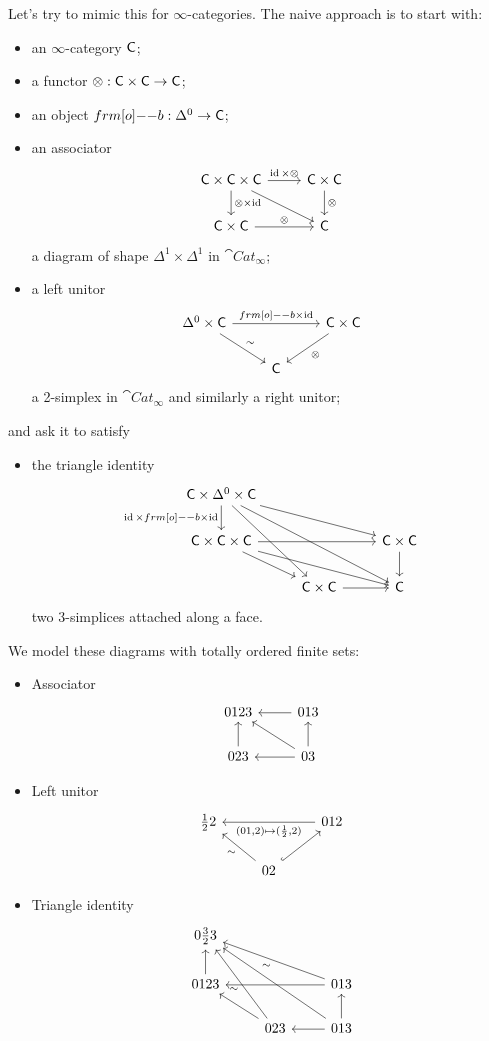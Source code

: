 	Let's try to mimic this for $\infty$-categories. The naive approach is to start with:
	\begin{itemize}
		\item an $\infty$-category $\mathsf{C}$;
		\item a functor $\otimes:\C\times \C\to \C$;
		\item an object $\1b:\Delta^{0}\to \C$;
		\item an associator
			\[
				\begin{tikzcd}
					\C\times \C\times \C \ar[r,"\id\times \otimes"] \ar[d,"\otimes\times \id"] \ar[dr] &
					\C \times \C \ar[d,"\otimes"] \\
					\C\times \C \ar[r,"\otimes"] & \C
				\end{tikzcd}
			\]
			a diagram of shape $\Delta^{1}\times \Delta^{1}$ in $\cat{Cat}_\infty$;
		\item a left unitor
			\[
				\begin{tikzcd}
					\Delta^{0}\times \C \ar[rr,"\1b\times \id"] \ar[dr,"\sim"] & & \C\times \C \ar[dl,"\otimes"] \\
					& \C
				\end{tikzcd}
			\]
			a 2-simplex in $\cat{Cat}_\infty$ and similarly a right unitor;
	\end{itemize}
	and ask it to satisfy
	\begin{itemize}
		\item the triangle identity
			\[
				\begin{tikzcd}
					\C\times \Delta^{0}\times \C \ar[d,"\id\times \1b\times \id"'] \ar[ddr] \ar[ddrr] \ar[drr] \\
					\C\times \C\times \C \ar[dr] \ar[rr] \ar[drr] & & \C\times \C \ar[d] \\
					& \C\times \C \ar[r] & \C
				\end{tikzcd}
			\]
			two 3-simplices attached along a face.
	\end{itemize}
	We model these diagrams with totally ordered finite sets:
	\begin{itemize}
		\item Associator
			\[
				\begin{tikzcd}
					0123 & 013 \ar[l] \\
					023 \ar[u] & 03 \ar[l] \ar[u] \ar[lu]
				\end{tikzcd}
			\]
		\item Left unitor
			\[
				\begin{tikzcd}
					\frac{1}{2}2 & & 012 \ar[ll, "{(01, 2)\mapsto (\frac{1}{2}, 2)}"] \\
					& 02 \ar[lu, "\sim"] \ar[ur,hook]
				\end{tikzcd}
			\]
		\item Triangle identity
			\[
				\begin{tikzcd}
					0 \frac{3}{2}3 \\
					0123 \ar[u] & & 013 \ar[ull,"\sim"] \ar[ll] \\
					& 023 \ar[ul] \ar[uul,"\sim"] & 013 \ar[l] \ar[u] \ar[uull]
				\end{tikzcd}
			\]
	\end{itemize}

